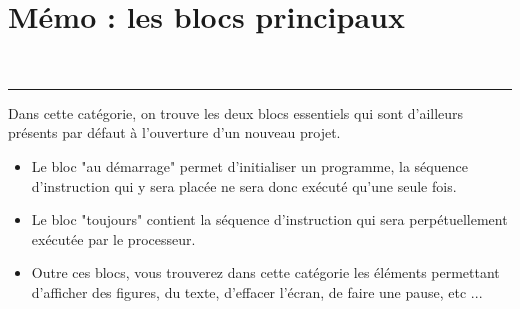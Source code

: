 \section{Mémo : les blocs principaux \mb}


\pagestyle{mb}

\begin{minipage}[t]{0.75\linewidth}

    \begin{blocBase}\\
      \rule{-0.25em}{2em}
      Dans cette catégorie, on trouve les deux blocs essentiels qui sont d'ailleurs présents par défaut à l'ouverture d'un nouveau projet.

      \begin{itemize}
        \item Le bloc "au démarrage" permet d'initialiser un programme, la séquence d'instruction qui y sera placée ne sera donc exécuté qu'une seule fois.
        \item   Le bloc "toujours" contient la séquence d'instruction qui sera perpétuellement exécutée par le processeur.
        \item Outre ces blocs, vous trouverez dans cette catégorie les éléments permettant d'afficher des figures, du texte, d'effacer l'écran, de faire une pause, etc ...
      \end{itemize}

    \end{blocBase}

\end{minipage}
\hfill
